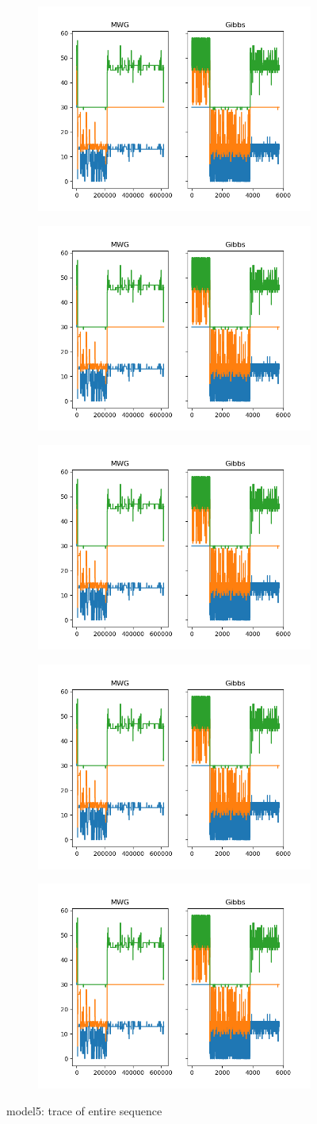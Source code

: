 \begin{figure}[h]
    \centering
    \begin{subfigure}
    	\centering
        \includegraphics[width=0.3\linewidth]{../../plots/Trace_M4_N60_NMCMC3_seed0_diffind2.png}
    \end{subfigure}
    \begin{subfigure}
        \centering
    	\includegraphics[width=0.3\linewidth]{../../plots/Trace_M4_N60_NMCMC3_seed0_diffind2.png}
	\end{subfigure}
	\begin{subfigure}
	    \centering
    	\includegraphics[width=0.3\linewidth]{../../plots/Trace_M4_N60_NMCMC3_seed0_diffind2.png}
	\end{subfigure}
	\begin{subfigure}
	    \centering
    	\includegraphics[width=0.3\linewidth]{../../plots/Trace_M4_N60_NMCMC3_seed0_diffind2.png}
	\end{subfigure}
	\begin{subfigure}
	    \centering
    	\includegraphics[width=0.3\linewidth]{../../plots/Trace_M4_N60_NMCMC3_seed0_diffind2.png}
	\end{subfigure}
	\caption{model5: trace of entire sequence}
\end{figure}

